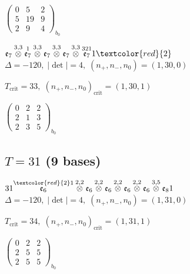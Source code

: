 \documentclass[10pt]{article}
\begin{document}
\hspace{2em}$\left(\begin{smallmatrix}0 & 5 & 2 \\ 5 & 19 & 9 \\ 2 & 9 & 4\end{smallmatrix}\right)_{\!b_0}$

$\mathfrak{e}_7\overset{3,3}{\otimes}\overset{1}{\mathfrak{e}_7}\overset{3,3}{\otimes}\mathfrak{e}_7\overset{3,3}{\otimes}\mathfrak{e}_7\overset{3,3}{\otimes}\overset{321}{\mathfrak{e}_7}1\textcolor{red}{2}$ \quad $\Delta=-120,\; |\det|=4,\; (n_+,n_-,n_0)=(1,30,0)$

\hspace{1em}$T_{\text{crit}}=33,\; (n_+,n_-,n_0)_{\text{crit}}=(1,30,1)$

\hspace{2em}$\left(\begin{smallmatrix}0 & 2 & 2 \\ 2 & 1 & 3 \\ 2 & 3 & 5\end{smallmatrix}\right)_{\!b_0}$


\subsection*{$T = 31$ \quad (9 bases)}
\smallskip

$31\overset{\textcolor{red}{2}1}{\mathfrak{e}_6}\overset{2,2}{\otimes}\mathfrak{e}_6\overset{2,2}{\otimes}\mathfrak{e}_6\overset{2,2}{\otimes}\mathfrak{e}_6\overset{2,2}{\otimes}\mathfrak{e}_6\overset{3,5}{\otimes}\mathfrak{e}_81$ \quad $\Delta=-120,\; |\det|=4,\; (n_+,n_-,n_0)=(1,31,0)$

\hspace{1em}$T_{\text{crit}}=34,\; (n_+,n_-,n_0)_{\text{crit}}=(1,31,1)$

\hspace{2em}$\left(\begin{smallmatrix}0 & 2 & 2 \\ 2 & 5 & 5 \\ 2 & 5 & 5\end{smallmatrix}\right)_{\!b_0}$

\smallskip
\end{document}
